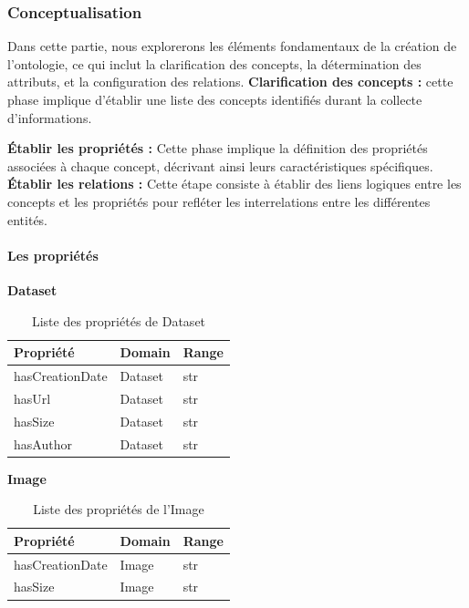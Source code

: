 \documentclass{article}
\begin{document}
		
	\subsubsection{Conceptualisation}
	Dans cette partie, nous explorerons les éléments fondamentaux de la création de l'ontologie, ce qui inclut la clarification des concepts, la détermination des attributs, et la configuration des relations.
	\textbf{ Clarification des concepts : } cette phase implique d'établir une liste des concepts identifiés durant la collecte d'informations.
	
	\textbf{ Établir les propriétés : }Cette phase implique la définition des propriétés associées à chaque concept, décrivant ainsi leurs caractéristiques spécifiques. \\
	
	\textbf{ Établir les relations : }Cette étape consiste à établir des liens logiques entre les concepts et les propriétés pour refléter les interrelations entre les différentes entités.
	
	\paragraph{Les propriétés}
	
	\noindent\textbf{Dataset}
	\begin{table}[H]
		\centering
		\begin{tabular}{|p{5cm}|p{5cm}|p{5cm}|}
			\hline
			\textbf{Propriété} & \textbf{Domain} & \textbf{Range} \\
			\hline
			hasCreationDate & Dataset & str \\
			\hline
			hasUrl & Dataset & str \\
			\hline
			hasSize & Dataset & str \\
			\hline
			hasAuthor & Dataset & str \\
			\hline
		\end{tabular}
		\caption{Liste des propriétés de Dataset}
	\end{table}
	
	\FloatBarrier %
	
	\noindent\textbf{Image}
	\begin{table}[H]
		\centering
		\begin{tabular}{|p{5cm}|p{5cm}|p{5cm}|}
			\hline
			\textbf{Propriété} & \textbf{Domain} & \textbf{Range} \\
			\hline
			hasCreationDate & Image & str \\
			\hline
			hasSize & Image & str \\
			\hline
		\end{tabular}
		\caption{Liste des propriétés de l'Image}
	\end{table}
	
\end{document}
